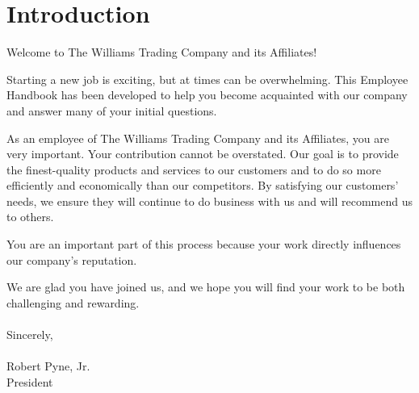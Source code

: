 \section{Introduction}

Welcome to The Williams Trading Company and its Affiliates!

Starting a new job is exciting, but at times can be overwhelming. This Employee Handbook has been developed to help you become acquainted with our company and answer many of your initial questions.

As an employee of The Williams Trading Company and its Affiliates, you are very important. Your contribution cannot be overstated. Our goal is to provide the finest-quality products and services to our customers and to do so more efficiently and economically than our competitors. By satisfying our customers' needs, we ensure they will continue to do business with us and will recommend us to others.

You are an important part of this process because your work directly influences our company's reputation.

We are glad you have joined us, and we hope you will find your work to be both challenging and rewarding.
\\
\\
Sincerely,
\\
\\
Robert Pyne, Jr.\\
President